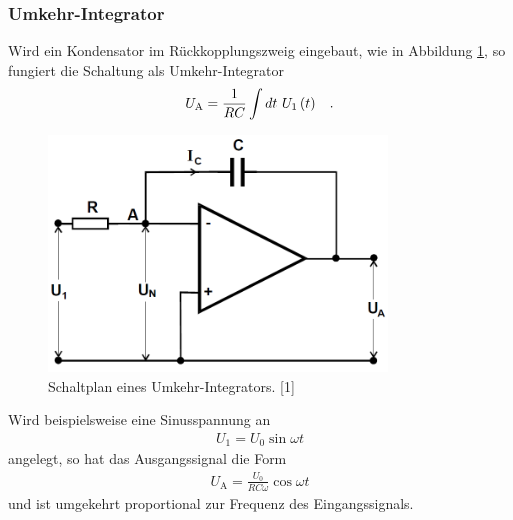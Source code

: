 \documentclass[]{scrartcl}
\begin{document}
\subsubsection{Umkehr-Integrator}
Wird ein Kondensator im Rückkopplungszweig eingebaut, wie in Abbildung \ref{fig:schalplan_umkehrintegrator}, so fungiert die Schaltung als Umkehr-Integrator
\begin{align}
U_\text{A}= \frac{1}{RC}\int dt\ U_1\left(t\right)  \hspace{0.3cm}\text{.}
\end{align}
\begin{figure}[H]
\centering
\includegraphics[width=9cm]{images/schalplan_umkehrintegrator.png}
\caption{Schaltplan eines Umkehr-Integrators. [1]}
\label{fig:schalplan_umkehrintegrator}
\end{figure}
Wird beispielsweise eine Sinusspannung an 
\begin{align}
U_1=U_0 \sin \omega t
\end{align}
angelegt, so hat das Ausgangssignal die Form
\begin{align}
U_\text{A} = \frac{U_0}{RC\omega}\cos \omega t
\end{align}
und ist umgekehrt proportional zur Frequenz des Eingangssignals.
\end{document}
